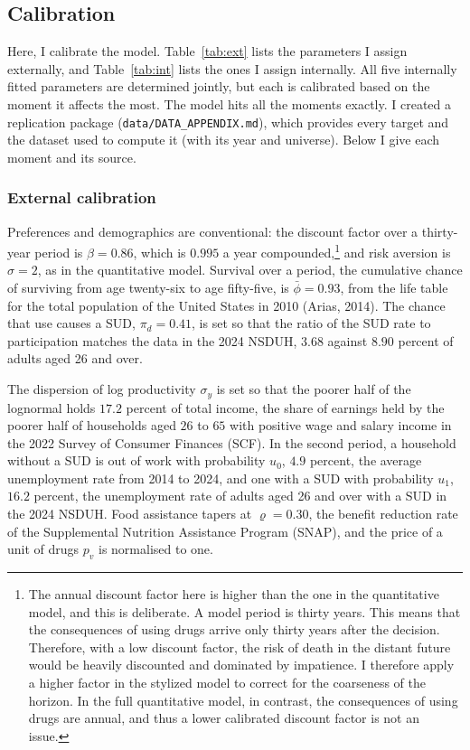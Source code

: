 \documentclass[10pt]{article}
\begin{document}
\subsection{Calibration}\label{sec:cal}

  Here, I calibrate the model. Table~\ref{tab:ext} lists the parameters I assign externally, and Table~\ref{tab:int} lists the ones I assign internally. All five internally fitted parameters are determined jointly, but each is calibrated based on the moment it affects the most. The model hits all the moments exactly. I created a replication package (\texttt{data/DATA\_APPENDIX.md}), which provides every target and the dataset used to compute it (with its year and universe). Below I give each moment and its source.

\subsubsection{External calibration}

Preferences and demographics are conventional: the discount factor over a
thirty-year period is $\beta=0.86$, which is $0.995$ a year compounded,\footnote{The annual discount factor here is higher than the one in the
quantitative model, and this is deliberate.    A model period is thirty years. This means that the consequences of using drugs arrive only thirty years after the decision. Therefore, with a low discount factor, the risk of death in the distant future would be heavily discounted and dominated by impatience. I therefore apply a higher factor in the stylized model to correct for the coarseness of the horizon. In the full quantitative model, in contrast, the consequences of using drugs are annual, and thus a lower calibrated discount factor is not an issue.} and risk aversion is
$\sigma=2$, as in the quantitative model. Survival over a period, the cumulative chance of surviving from age twenty-six to age fifty-five, is
$\bar\phi = 0.93$, from the life table for the total population of the United States in 2010
(Arias, 2014). The chance that use causes a SUD, $\pi_d=0.41$, is set so that the ratio of the SUD rate to participation matches the data in the 2024 NSDUH, $3.68$ against $8.90$ percent of adults aged 26 and over.

The dispersion of log productivity $\sigma_y$ is set so that the poorer half of the lognormal holds $17.2$ percent of total income, the share of earnings held by the poorer half of households aged $26$ to $65$ with positive wage and salary income in the 2022 Survey of Consumer Finances (SCF). In the second period, a household without a SUD is out of work with probability $u_0$, $4.9$ percent, the average unemployment rate from 2014 to 2024, and one with a SUD with probability $u_1$, $16.2$ percent, the unemployment rate of adults aged 26 and over with a SUD in the 2024 NSDUH. Food assistance tapers at $\varrho=0.30$, the benefit reduction rate of the Supplemental Nutrition Assistance Program (SNAP), and the price of a unit of drugs $p_v$ is normalised to one.
\end{document}
